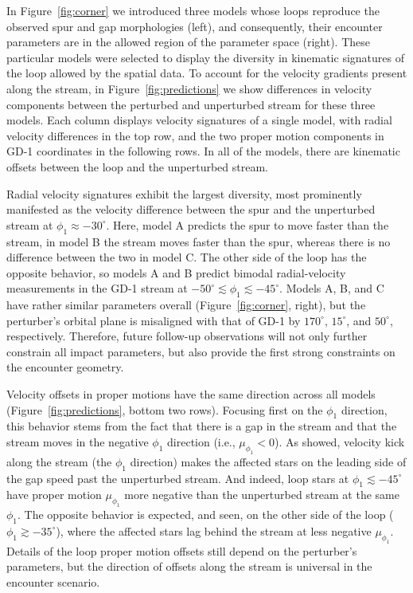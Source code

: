 \documentclass[twocolumn]{aastex62}
\begin{document}
In Figure~\ref{fig:corner} we introduced three models whose loops reproduce the observed spur and gap morphologies (left), and consequently, their encounter parameters are in the allowed region of the parameter space (right).
These particular models were selected to display the diversity in kinematic signatures of the loop allowed by the spatial data.
To account for the velocity gradients present along the stream, in Figure~\ref{fig:predictions} we show differences in velocity components between the perturbed and unperturbed stream for these three models.
Each column displays velocity signatures of a single model, with radial velocity differences in the top row, and the two proper motion components in GD-1 coordinates in the following rows.
In all of the models, there are kinematic offsets between the loop and the unperturbed stream.

Radial velocity signatures exhibit the largest diversity, most prominently manifested as the velocity difference between the spur and the unperturbed stream at $\phi_1\approx-30^\circ$.
Here, model A predicts the spur to move faster than the stream, in model B the stream moves faster than the spur, whereas there is no difference between the two in model C.
The other side of the loop has the opposite behavior, so models A and B predict bimodal radial-velocity measurements in the GD-1 stream at $-50^\circ\lesssim\phi_1\lesssim-45^\circ$.
Models A, B, and C have rather similar parameters overall (Figure~\ref{fig:corner}, right), but the perturber's orbital plane is misaligned with that of GD-1 by $170^\circ$, $15^\circ$, and $50^\circ$, respectively.
Therefore, future follow-up observations will not only further constrain all impact parameters, but also provide the first strong constraints on the encounter geometry.

Velocity offsets in proper motions have the same direction across all models (Figure~\ref{fig:predictions}, bottom two rows).
Focusing first on the $\phi_1$ direction, this behavior stems from the fact that there is a gap in the stream and that the stream moves in the negative $\phi_1$ direction (i.e., $\mu_{\phi_1}<0$).
As \citet{eb2015} showed, velocity kick along the stream (the $\phi_1$ direction) makes the affected stars on the leading side of the gap speed past the unperturbed stream.
And indeed, loop stars at $\phi_1\lesssim-45^\circ$ have proper motion $\mu_{\phi_1}$ more negative than the unperturbed stream at the same $\phi_1$.
The opposite behavior is expected, and seen, on the other side of the loop ($\phi_1\gtrsim-35^\circ$), where the affected stars lag behind the stream at less negative $\mu_{\phi_1}$.
Details of the loop proper motion offsets still depend on the perturber's parameters, but the direction of offsets along the stream is universal in the encounter scenario.
\end{document}
